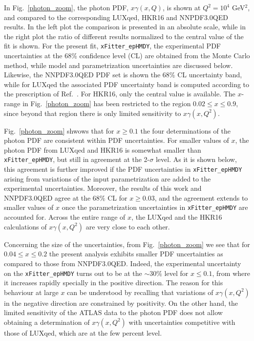 In Fig.~\ref{photon_zoom}, the photon PDF, $x\gamma(x,Q)$, is shown at
$Q^2=10^4$ GeV$^2$,  and compared to the corresponding LUXqed,
HKR16 and NNPDF3.0QED results.
%
In the left plot the comparison is presented in an absolute scale, while
in the right plot the ratio of
different results normalized to
the central value of the fit is shown.
%
For the present fit, {\tt xFitter\_epHMDY}, 
the experimental PDF uncertainties at the 68\% confidence level (CL) are obtained from the Monte Carlo method,
 while model and parametrization uncertainties are discussed below.
Likewise, the  NNPDF3.0QED PDF set is shown the 68\% CL uncertainty band,
while for LUXqed the associated PDF uncertainty band is computed according to the
prescription of Ref.~\cite{Manohar:2016nzj}.
For HKR16, only the central value is available.
%
The $x$-range in Fig.~\ref{photon_zoom} has been restricted to the region
$0.02 \le x \le 0.9$, since beyond that region there is only limited sensitivity to $x\gamma(x,Q^2)$.

Fig.~\ref{photon_zoom} shwows that for $x\ge 0.1$ the four determinations of
the photon PDF are consistent within PDF uncertainties.
%
For smaller values of $x$, the photon PDF from LUXqed and HKR16 is somewhat smaller than {\tt xFitter\_epHMDY},
but still in agreement at the 2-$\sigma$ level.
%
As it is shown below, this agreement is further improved if the PDF uncertainties in
{\tt xFitter\_epHMDY}
arising from variations of the input parametrization are added to the experimental
uncertainties.
%
Moreover, the results of this work and NNPDF3.0QED agree at the 68\% CL for $x\ge 0.03$,
and the agreement extends to smaller values of $x$ once the parametrization
uncertainties in {\tt xFitter\_epHMDY} are accounted for.
%
Across the entire range of $x$, the LUXqed and the HKR16 calculations of $x\gamma(x,Q^2)$ are very close
to each other.

Concerning the size of the uncertainties, from Fig.~\ref{photon_zoom} we see that
for $0.04 \le x \le 0.2$ the present analysis  exhibits smaller PDF
uncertainties as compared to those from  NNPDF3.0QED.
%
Indeed, the experimental uncertainty on the {\tt xFitter\_epHMDY}
turns out to be at the  $\sim 30\%$ level for $x\le 0.1$, from where it increases
rapidly specially in the positive direction.
%
The reason for this behaviour at large $x$ can be understood by recalling that
variations of $x\gamma(x,Q^2)$ in the negative
direction are constrained by positivity.
%
On the other hand, the limited sensitivity of the ATLAS data to the photon
PDF does not allow obtaining a determination of $x\gamma(x,Q^2)$ with uncertainties
competitive with those of LUXqed, which are at the few percent level.

